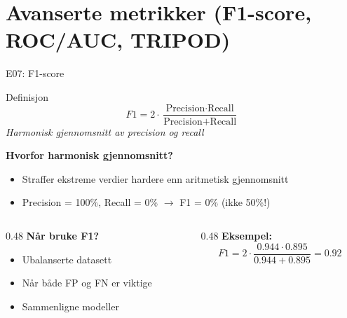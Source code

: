 \documentclass[aspectratio=169, 10pt]{beamer}
\begin{document}
\section{Avanserte metrikker (F1-score, ROC/AUC, TRIPOD)}

\begin{frame}{E07: F1-score}
    
    \begin{block}{Definisjon}
        \[
        F1 = 2 \cdot \frac{\text{Precision} \cdot \text{Recall}}{\text{Precision} + \text{Recall}}
        \]
        \textit{Harmonisk gjennomsnitt av precision og recall}
    \end{block}
    
    \vspace{3mm}
    
    \textbf{Hvorfor harmonisk gjennomsnitt?}
    \begin{itemize}
        \item Straffer ekstreme verdier hardere enn aritmetisk gjennomsnitt
        \item Precision = 100\%, Recall = 0\% $\rightarrow$ F1 = 0\% (ikke 50\%!)
    \end{itemize}
    
    \vspace{3mm}
    
    \begin{columns}
        \begin{column}{0.48\textwidth}
            \textbf{Når bruke F1?}
            \begin{itemize}
                \item Ubalanserte datasett
                \item Når både FP og FN er viktige
                \item Sammenligne modeller
            \end{itemize}
        \end{column}
        
        \begin{column}{0.48\textwidth}
            \textbf{Eksempel:}
            \[
            F1 = 2 \cdot \frac{0.944 \cdot 0.895}{0.944 + 0.895} = 0.92
            \]
        \end{column}
    \end{columns}
    
\end{frame}
\end{document}
